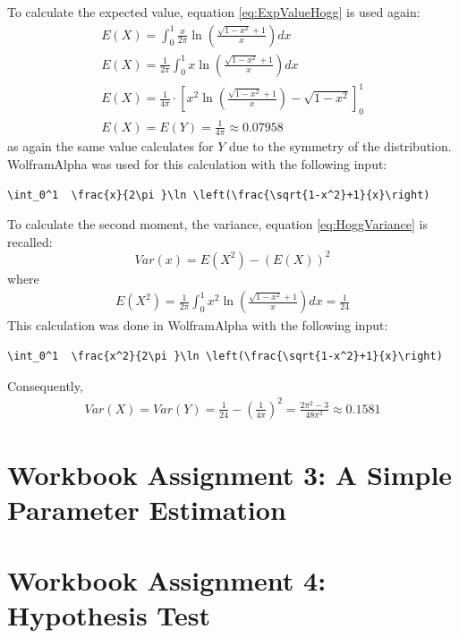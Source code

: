 To calculate the expected value, equation \ref{eq:ExpValueHogg} is used again:
\begin{equation}
\begin{split}
E(X) = \int_0^1  \frac{x}{2\pi }\ln \left(\frac{\sqrt{1-x^2}+1}{x}\right) dx\\
E(X) = \frac{1}{2\pi}\int_0^1  x\ln \left(\frac{\sqrt{1-x^2}+1}{x}\right) dx\\
E(X) = \frac{1}{4\pi } \cdot \left[x^2\ln \left(\frac{\sqrt{1-x^2}+1}{x}\right)-\sqrt{1-x^2}\right]_0^1\\
E(X) = E(Y) = \frac{1}{4\pi} \approx 0.07958
\end{split}
\label{eq:expvalF_X}
\end{equation}
as again the same value calculates for $Y$ due to the symmetry of the distribution.
WolframAlpha \cite{wolfalph} was used for this calculation with the following input:
\begin{lstlisting}
\int_0^1  \frac{x}{2\pi }\ln \left(\frac{\sqrt{1-x^2}+1}{x}\right)
\end{lstlisting}

To calculate the second moment, the variance, equation \ref{eq:HoggVariance} is recalled:
\[
Var(x) = E(X^2)-(E(X))^2
\]
where
\begin{equation}
\begin{split}
E(X^2) =  \frac{1}{2\pi}\int_0^1  x^2\ln \left(\frac{\sqrt{1-x^2}+1}{x}\right) dx = \frac{1}{24}
\end{split}
\label{eq:E(X^2)}
\end{equation}
This calculation was done in WolframAlpha \cite{wolfalph} with the following input:
\begin{lstlisting}
\int_0^1  \frac{x^2}{2\pi }\ln \left(\frac{\sqrt{1-x^2}+1}{x}\right)
\end{lstlisting}
Consequently, 
\begin{equation}
\begin{split}
Var(X) = Var(Y) = \frac{1}{24}- \left(\frac{1}{4\pi}\right)^2 = \frac{2\pi ^2-3}{48\pi ^2} \approx 0.1581
\end{split}
\label{eq:VarXcalculated}
\end{equation}



\chapter{Workbook Assignment 3: A Simple Parameter Estimation}	
\chapter{Workbook Assignment 4: Hypothesis Test}	

